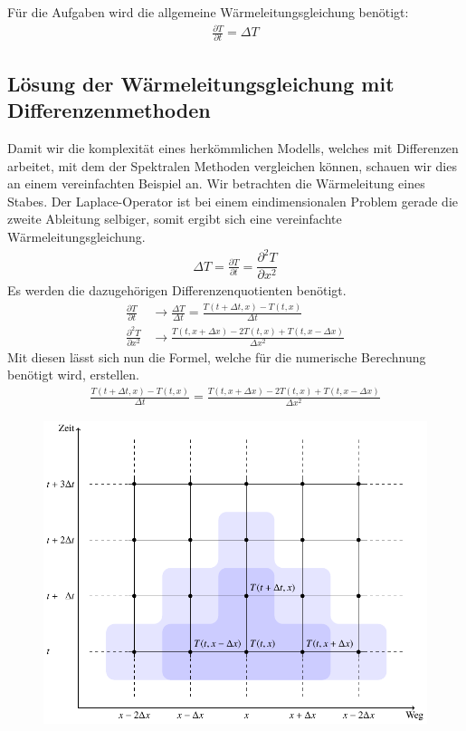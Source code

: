 \begin{refsection}
Für die Aufgaben wird die allgemeine Wärmeleitungsgleichung benötigt:
\begin{align}
\frac{\partial T}{\partial t} =  \Delta T 
\label{klima:bsp:pdgl}
\end{align}



\subsection{Lösung der Wärmeleitungsgleichung mit Differenzenmethoden}
Damit wir die komplexität eines herkömmlichen Modells, welches mit Differenzen arbeitet, mit dem der Spektralen Methoden vergleichen können, schauen wir dies an einem vereinfachten Beispiel an. Wir betrachten die Wärmeleitung eines Stabes.
Der Laplace-Operator ist bei einem eindimensionalen Problem gerade die zweite Ableitung selbiger, somit ergibt sich eine vereinfachte Wärmeleitungsgleichung.
\begin{align}
\Delta T = \frac{\partial T}{\partial t}=\dfrac{\partial^2 T}{\partial x^2}
\end{align}
Es werden die dazugehörigen Differenzenquotienten benötigt.
\begin{align}
\frac{\partial T}{\partial t}
&\rightarrow
\frac{\Delta T}{\Delta t}=
\frac{T(t+\Delta t,x)-T(t,x)}{\Delta t}
\\
\frac{\partial^2 T}{\partial x^2}
&\rightarrow
\frac{T(t,x+\Delta x)-2T(t,x)+T(t,x-\Delta x)}{\Delta x^2}
\end{align}
Mit diesen lässt sich nun die Formel, welche für die numerische Berechnung benötigt wird, erstellen.
\begin{align}
\frac{T(t+\Delta t,x)-T(t,x)}{\Delta t}
=
\frac{T(t,x+\Delta x)-2T(t,x)+T(t,x-\Delta x)}{\Delta x^2}
\label{klima:bsp:diff}
\end{align}
\begin{figure}
\centering
\includegraphics[width=\hsize]{klima/differenzen.pdf}

\end{figure}
\end{refsection}
